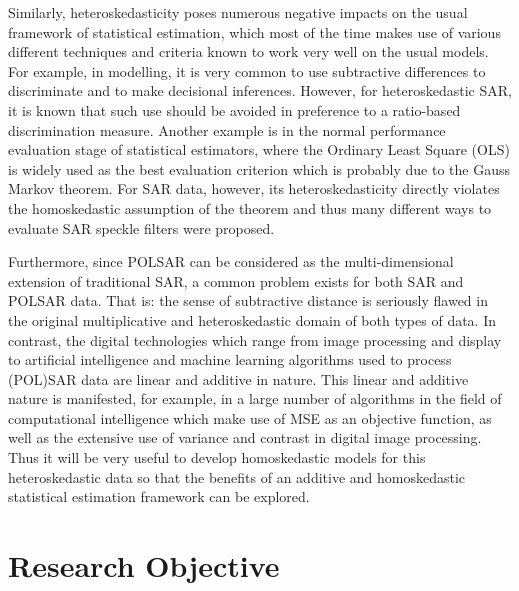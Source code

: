 Similarly, heteroskedasticity poses numerous negative impacts on the usual framework of statistical estimation, which most of the time makes use of various different techniques and criteria known to work very well on the usual models.
For example, in modelling, it is very common to use subtractive differences to discriminate and to make decisional inferences. However, for heteroskedastic SAR, it is known that such use should be avoided in preference to a ratio-based discrimination measure.
Another example is in the normal performance evaluation stage of statistical estimators, where the Ordinary Least Square (OLS) is widely used as the best evaluation criterion which is probably due to the Gauss Markov theorem.
For SAR data, however, its heteroskedasticity directly violates the homoskedastic assumption of the theorem and thus many different ways to evaluate SAR speckle filters were proposed.

Furthermore, since POLSAR can be considered as the multi-dimensional extension of
traditional SAR, a common problem exists for both SAR and POLSAR data. That
is: the sense of subtractive distance is seriously flawed in the original multiplicative
and heteroskedastic domain of both types of data. 
In contrast, the digital technologies which range from image processing and display to artificial intelligence and machine learning algorithms used to process (POL)SAR data are linear
and additive in nature. 
This linear and additive nature is manifested, for example, in a
large number of algorithms in the field of computational intelligence which make use of
MSE as an objective function, as well as the extensive use of variance and
contrast in digital image processing. 
Thus it will be very useful to develop homoskedastic models for this heteroskedastic data
  so that the benefits of an additive and homoskedastic statistical estimation framework can be explored.



\section{Research Objective}

